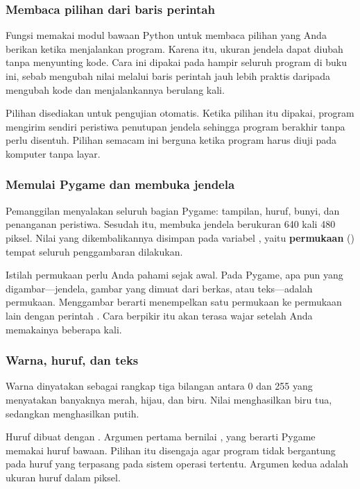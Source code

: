 \subsubsection{Membaca pilihan dari baris perintah}

Fungsi  memakai modul  bawaan Python untuk
membaca pilihan yang Anda berikan ketika menjalankan program. Karena itu,
ukuran jendela dapat diubah tanpa menyunting kode. Cara ini dipakai pada
hampir seluruh program di buku ini, sebab mengubah nilai melalui baris
perintah jauh lebih praktis daripada mengubah kode dan menjalankannya
berulang kali.

Pilihan  disediakan untuk pengujian otomatis. Ketika
pilihan itu dipakai, program mengirim sendiri peristiwa penutupan jendela
sehingga program berakhir tanpa perlu disentuh. Pilihan semacam ini berguna
ketika program harus diuji pada komputer tanpa layar.

\subsubsection{Memulai Pygame dan membuka jendela}

Pemanggilan  menyalakan seluruh bagian Pygame: tampilan,
huruf, bunyi, dan penanganan peristiwa. Sesudah itu,
 membuka jendela berukuran
640 kali 480 piksel. Nilai yang dikembalikannya disimpan pada variabel
, yaitu \textbf{permukaan} () tempat seluruh
penggambaran dilakukan.

Istilah permukaan perlu Anda pahami sejak awal. Pada Pygame, apa pun yang
digambar---jendela, gambar yang dimuat dari berkas, atau teks---adalah
permukaan. Menggambar berarti menempelkan satu permukaan ke permukaan lain
dengan perintah . Cara berpikir itu akan terasa wajar setelah Anda
memakainya beberapa kali.

\subsubsection{Warna, huruf, dan teks}

Warna dinyatakan sebagai rangkap tiga bilangan antara 0 dan 255 yang
menyatakan banyaknya merah, hijau, dan biru. Nilai 
menghasilkan biru tua, sedangkan  menghasilkan putih.

Huruf dibuat dengan . Argumen pertama bernilai
, yang berarti Pygame memakai huruf bawaan. Pilihan itu disengaja
agar program tidak bergantung pada huruf yang terpasang pada sistem operasi
tertentu. Argumen kedua adalah ukuran huruf dalam piksel.

